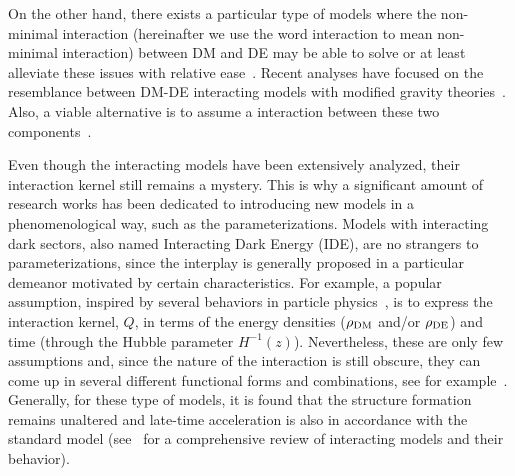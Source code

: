 \documentclass[twocolumn,a4paper,reprint,amssymb,aps,prd,groupedaddress,superscriptaddress,nofootinbib]{revtex4-2}
\begin{document}
On the other hand, there exists a particular type of models where the non-minimal interaction (hereinafter
we use the word interaction to mean non-minimal interaction) between DM and DE may be able to solve or at
least alleviate these issues with relative ease~\cite{Kumar:2017dnp, Kumar:2019wfs,
DiValentino:2017iww, Pourtsidou:2016ico, An:2017crg, Cai:2004dk, delCampo:2008jx, Yang:2018uae, Yang:2018ubt,
Pan:2019gop, DiValentino:2019ffd,DiValentino:2019jae,Gomez-Valent:2020mqn, Lucca:2020zjb, Bernui:2023byc,
Nunes:2022bhn, Nunes:2021zzi}. Recent analyses have focused on the resemblance between DM-DE interacting
models with modified gravity theories~\cite{Wang:2016lxa, Kofinas:2016fcp, Johnson:2020gzn, Johnson:2021wou}.
Also, a viable alternative is to assume a  interaction between these two
components~\cite{Brax:2006kg,Bolotin:2013jpa}.

Even though the interacting models have been extensively analyzed, their interaction kernel still remains a mystery.
%
This is why a significant amount of research works has been dedicated to introducing new models in a phenomenological way, such as the parameterizations. Models with interacting dark sectors, also named Interacting Dark Energy (IDE), are no strangers to
parameterizations, since the interplay is generally proposed in a particular demeanor motivated by certain characteristics. For example, a popular assumption, inspired by several behaviors in particle physics~\cite{Pan:2020zza}, is to express the interaction kernel, $Q$, in terms of the energy densities ($\rho_{\rm DM}$
and/or $\rho_{\rm DE}$) and time (through the Hubble parameter $H^{-1}(z)$). Nevertheless, these are only few
assumptions and, since the nature of the interaction is still obscure, they can come up in several different
functional forms and combinations, see for example~\cite{Kumar:2019wfs,  DiValentino:2017iww, Wang:2016lxa,
Yang:2018uae,Pan:2019gop,Yang:2022csz}.
%
Generally, for these type of models, it is found that the structure formation remains unaltered and late-time
acceleration is also in accordance with the standard model (see~\cite{Wang:2016lxa, Bolotin:2013jpa} for
a comprehensive review of interacting models and their behavior).
\end{document}
